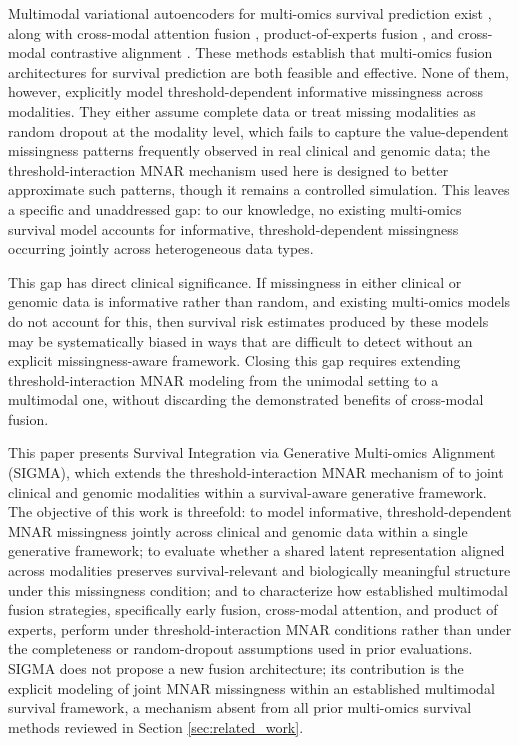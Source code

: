 \documentclass[final,3p,times,authoryear]{elsarticle}
\begin{document}
Multimodal variational autoencoders for multi-omics survival prediction exist \citep{chang2025myevae,chen2026moriskvae}, along with cross-modal attention fusion \citep{li2023mavae}, product-of-experts fusion \citep{wu2018multimodal}, and cross-modal contrastive alignment \citep{li2025cpathomic,rajaram2024dacmva}. These methods establish that multi-omics fusion architectures for survival prediction are both feasible and effective. None of them, however, explicitly model threshold-dependent informative missingness across modalities. They either assume complete data or treat missing modalities as random dropout at the modality level, which fails to capture the value-dependent missingness patterns frequently observed in real clinical and genomic data; the threshold-interaction MNAR mechanism used here is designed to better approximate such patterns, though it remains a controlled simulation. This leaves a specific and unaddressed gap: to our knowledge, no existing multi-omics survival model accounts for informative, threshold-dependent missingness occurring jointly across heterogeneous data types.

This gap has direct clinical significance. If missingness in either clinical or genomic data is informative rather than random, and existing multi-omics models do not account for this, then survival risk estimates produced by these models may be systematically biased in ways that are difficult to detect without an explicit missingness-aware framework. Closing this gap requires extending threshold-interaction MNAR modeling from the unimodal setting to a multimodal one, without discarding the demonstrated benefits of cross-modal fusion.

This paper presents Survival Integration via Generative Multi-omics Alignment (SIGMA), which extends the threshold-interaction MNAR mechanism of \citet{mnarsvae} to joint clinical and genomic modalities within a survival-aware generative framework. The objective of this work is threefold: to model informative, threshold-dependent MNAR missingness jointly across clinical and genomic data within a single generative framework; to evaluate whether a shared latent representation aligned across modalities preserves survival-relevant and biologically meaningful structure under this missingness condition; and to characterize how established multimodal fusion strategies, specifically early fusion, cross-modal attention, and product of experts, perform under threshold-interaction MNAR conditions rather than under the completeness or random-dropout assumptions used in prior evaluations. SIGMA does not propose a new fusion architecture; its contribution is the explicit modeling of joint MNAR missingness within an established multimodal survival framework, a mechanism absent from all prior multi-omics survival methods reviewed in Section \ref{sec:related_work}.
\end{document}
